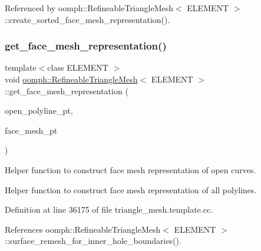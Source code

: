Referenced by oomph\+::\+Refineable\+Triangle\+Mesh$<$ E\+L\+E\+M\+E\+N\+T $>$\+::create\+\_\+sorted\+\_\+face\+\_\+mesh\+\_\+representation().

\mbox{\label{classoomph_1_1RefineableTriangleMesh_a8e233cfcfb0b0e5b287c347f31980786}} 
\subsubsection{\texorpdfstring{get\+\_\+face\+\_\+mesh\+\_\+representation()}{get\_face\_mesh\_representation()}\hspace{0.1cm}{\footnotesize\ttfamily [2/2]}}
{\footnotesize\ttfamily template$<$class E\+L\+E\+M\+E\+NT $>$ \\
void \hyperlink{classoomph_1_1RefineableTriangleMesh}{oomph\+::\+Refineable\+Triangle\+Mesh}$<$ E\+L\+E\+M\+E\+NT $>$\+::get\+\_\+face\+\_\+mesh\+\_\+representation (\begin{DoxyParamCaption}\item[{Triangle\+Mesh\+Open\+Curve $\ast$}]{open\+\_\+polyline\+\_\+pt,  }\item[{Vector$<$ Mesh $\ast$$>$ \&}]{face\+\_\+mesh\+\_\+pt }\end{DoxyParamCaption})\hspace{0.3cm}{\ttfamily [protected]}}



Helper function to construct face mesh representation of open curves. 

Helper function to construct face mesh representation of all polylines. 

Definition at line 36175 of file triangle\+\_\+mesh.\+template.\+cc.



References oomph\+::\+Refineable\+Triangle\+Mesh$<$ E\+L\+E\+M\+E\+N\+T $>$\+::surface\+\_\+remesh\+\_\+for\+\_\+inner\+\_\+hole\+\_\+boundaries().

\mbox{\label{classoomph_1_1RefineableTriangleMesh_a3aa0f6e9e28b77d42505e24b3d68af8a}} 
